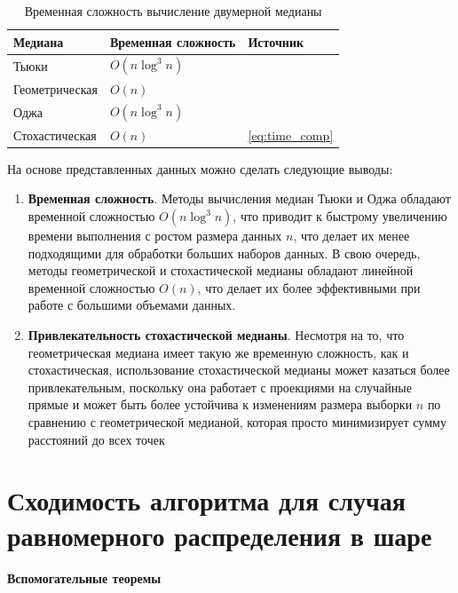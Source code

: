 \documentclass[specialist,
substylefile = spbu.rtx,
               subf,href,colorlinks=true, 12pt]{disser}
\begin{document}
\begin{table}[!ht]
 \caption{Временная сложность вычисление двумерной медианы}
    \label{table: time}
    \centering
    \begin{tabular}{|l|l|l|}
    \hline
        \textbf{Медиана} & \textbf{Временная сложность} & \textbf{Источник} \\ \hline
        Тьюки  & $O(n\log^3n)$ & \cite{langerman2003optimization}
\\ \hline
        Геометрическая 
 &  $O(n)$ & \cite{cohen2016geometric} \\ \hline
        Оджа
 &  $O(n\log^3n)$ &  \cite{aloupis2003algorithms} \\ \hline
        Стохастическая &  $O(n)$ & \ref{eq:time_comp} \\ \hline
    \end{tabular}
\end{table}

На основе представленных данных можно сделать следующие выводы:

\begin{enumerate}
   \item \textbf{Временная сложность}. Методы вычисления медиан Тьюки и Оджа обладают временной сложностью \(O(n\log^3n)\), что приводит к быстрому увеличению времени выполнения с ростом размера данных \(n\), что делает их менее подходящими для обработки больших наборов данных. В свою очередь, методы геометрической и стохастической медианы обладают линейной временной сложностью \(O(n)\), что делает их более эффективными при работе с большими объемами данных.

   \item \textbf{Привлекательность стохастической медианы}. Несмотря на то, что геометрическая медиана имеет такую же временную сложность, как и стохастическая, использование стохастической медианы может казаться более привлекательным, поскольку она работает с проекциями на случайные прямые и может быть более устойчива к изменениям размера выборки $n$ по сравнению с геометрической медианой, которая просто минимизирует сумму расстояний до всех точек

\end{enumerate}

\section{Сходимость алгоритма для случая равномерного распределения в шаре}

\textbf{Вспомогательные теоремы}
\end{document}
